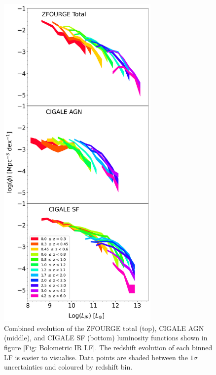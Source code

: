 \begin{figure}
    \centering
    \includegraphics[width=0.7\textwidth]{Figures/LF_Filled.png}
    \caption{Combined evolution of the ZFOURGE total (top), CIGALE AGN (middle), and CIGALE SF (bottom) luminosity functions shown in figure \ref{Fig: Bolometric IR LF}. The redshift evolution of each binned LF is easier to visualise. Data points are shaded between the $1\sigma$ uncertainties and coloured by redshift bin.}
    \label{Fig: LF Filled}
\end{figure}

